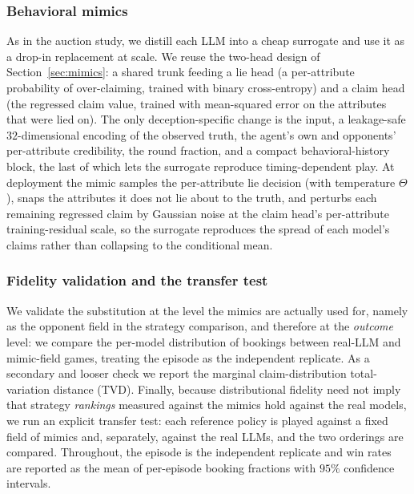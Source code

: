 \subsubsection{Behavioral mimics}
\label{sec:dec5-mimics}
As in the auction study, we distill each LLM into a cheap surrogate and use it as a drop-in replacement at scale. We reuse the two-head design of Section~\ref{sec:mimics}: a shared trunk feeding a lie head (a per-attribute probability of over-claiming, trained with binary cross-entropy) and a claim head (the regressed claim value, trained with mean-squared error on the attributes that were lied on). The only deception-specific change is the input, a leakage-safe $32$-dimensional encoding of the observed truth, the agent's own and opponents' per-attribute credibility, the round fraction, and a compact behavioral-history block, the last of which lets the surrogate reproduce timing-dependent play. At deployment the mimic samples the per-attribute lie decision (with temperature $\Theta$), snaps the attributes it does not lie about to the truth, and perturbs each remaining regressed claim by Gaussian noise at the claim head's per-attribute training-residual scale, so the surrogate reproduces the spread of each model's claims rather than collapsing to the conditional mean.

\subsubsection{Fidelity validation and the transfer test}
\label{sec:dec5-fidelity-method}
We validate the substitution at the level the mimics are actually used for, namely as the opponent field in the strategy comparison, and therefore at the \emph{outcome} level: we compare the per-model distribution of bookings between real-LLM and mimic-field games, treating the episode as the independent replicate. As a secondary and looser check we report the marginal claim-distribution total-variation distance (TVD). Finally, because distributional fidelity need not imply that strategy \emph{rankings} measured against the mimics hold against the real models, we run an explicit transfer test: each reference policy is played against a fixed field of mimics and, separately, against the real LLMs, and the two orderings are compared. Throughout, the episode is the independent replicate and win rates are reported as the mean of per-episode booking fractions with $95\%$ confidence intervals.



